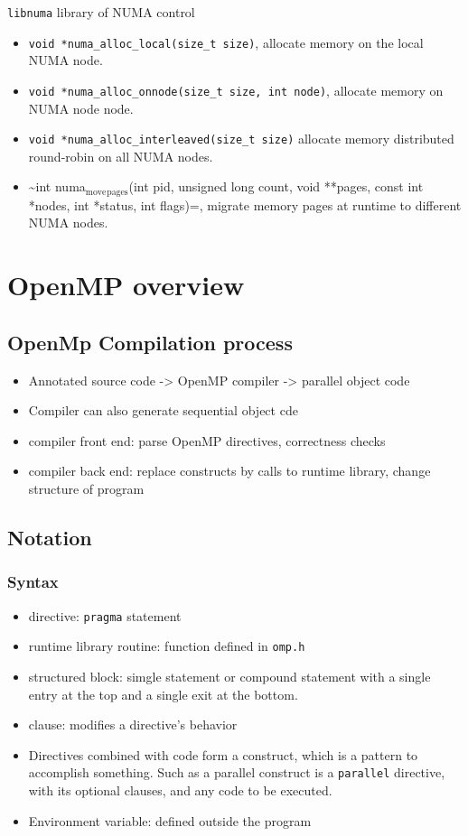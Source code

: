 \documentclass[11pt]{article}
\begin{document}
\verb~libnuma~ library of NUMA control
\begin{itemize}
\item \texttt{void *numa\_alloc\_local(size\_t size)}, allocate memory on the local NUMA node.
\item \texttt{void *numa\_alloc\_onnode(size\_t size, int node)}, allocate memory on NUMA node node.
\item \texttt{void *numa\_alloc\_interleaved(size\_t size)} allocate memory distributed round-robin on all NUMA nodes.
\item \textasciitilde{}int numa$_{\text{move}}$$_{\text{pages}}$(int pid, unsigned long count, void **pages, const int *nodes, int *status, int flags)=, migrate memory pages at runtime to different NUMA nodes.
\end{itemize}
\section{OpenMP overview}
\label{sec-2}
\subsection{OpenMp Compilation process}
\label{sec-2-1}
\begin{itemize}
\item Annotated source code -> OpenMP compiler -> parallel object code
\item Compiler can also generate sequential object cde
\item compiler front end: parse OpenMP directives, correctness checks
\item compiler back end: replace constructs by calls to runtime library, change structure of program
\end{itemize}
\subsection{Notation}
\label{sec-2-2}
\subsubsection{Syntax}
\label{sec-2-2-1}
\begin{itemize}
\item directive: \verb~pragma~ statement
\item runtime library routine: function defined in \verb~omp.h~
\item structured block: simgle statement or compound statement with a single entry at the top and a single exit at the bottom.
\item clause: modifies a directive's behavior
\item Directives combined with code form a construct, which is a pattern to accomplish something. Such as a parallel construct is a \verb~parallel~ directive, with its optional clauses, and any code to be executed.
\item Environment variable: defined outside the program
\end{itemize}
\end{document}
